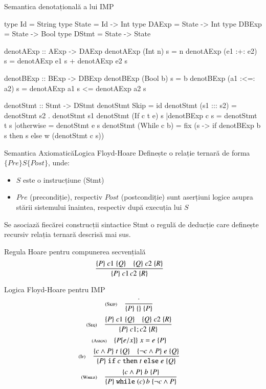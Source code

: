 \documentclass[xcolor=pdftex,romanian,colorlinks]{beamer}
\begin{document}
\begin{frame}[fragile]{Semantica denotațională a lui IMP}
\begin{minipage}{.46\columnwidth}
\begin{asciihs}
type Id = String
type State = Id -> Int
type DAExp = State -> Int
type DBExp = State -> Bool
type DStmt = State -> State

denotAExp :: AExp -> DAExp
denotAExp (Int n) s = n
denotAExp (e1 :+: e2) s
  = denotAExp e1 s
  + denotAExp e2 s

denotBExp :: BExp -> DBExp
denotBExp (Bool b) s = b
denotBExp (a1 :<=: a2) s
  = denotAExp a1 s
  <= denotAExp a2 s

\end{asciihs}
\end{minipage}
\begin{minipage}{.53\columnwidth}
\begin{asciihs}
denotStmt :: Stmt -> DStmt
denotStmt Skip = id
denotStmt (s1 ::: s2) =
  denotStmt s2 . denotStmt s1
denotStmt (If c t e) s
 |denotBExp c s = denotStmt t s
 |otherwise     = denotStmt e s
denotStmt (While c b) =
  fix (\w s ->
    if denotBExp b s
      then s
      else w (denotStmt c s))
\end{asciihs}
\end{minipage}
\end{frame}

\begin{frame}{Semantica Axiomatică}{Logica Floyd-Hoare}
  Definește o relație ternară de forma
  $\{Pre\}S\{Post\}$, unde:
  \begin{itemize}
    \item $S$ este o instrucțiune (Stmt)
    \item $Pre$ (precondiție), respectiv $Post$ (postcondiție) sunt aserțiuni logice asupra stării sistemului înaintea, respectiv după execuția lui $S$
  \end{itemize}

  Se asociază fiecărei construcții sintactice Stmt o regulă de deducție care
definește recursiv relația ternară descrisă mai sus.

\begin{block}{Regula Hoare pentru compunerea secvențială}
\[\reg{\{P\}\;c1\, c2\;\{R\}}{\{P\}\;c1 \;\{Q\}\si\{Q\}\;c2\;\{R\}}{}\]
\end{block}
\end{frame}

\begin{frame}{Logica Floyd-Hoare pentru IMP}
\[\reg[Skip]{\{P\}\; \{\} \;\{P\}}{\cdot}{}\]
\vfill
\[\reg[Seq]{\{P\}\;c1 ; c2\;\{R\}}{\{P\}\;c1 \;\{Q\}\si\{Q\}\;c2\;\{R\}}{}\]
\vfill
\[\reg[Asign]{\{P[e/x]\}\;x = e\;\{P\}}{}{}\]
\vfill
\[\reg[If]{\{P\}\Sif c \Sthen t \Selse e\;\{Q\}}{\{c\wedge P\}\;t \;\{Q\}\si\{\neg c\wedge P\}\;e\;\{Q\}}{}\]
\vfill
\[\reg[While]{\{P\}\Swhile(c)\,b\;\{\neg c \wedge P\}}{\{c\wedge P\}\;b \;\{P\}}{}\]
\end{frame}
\end{document}

